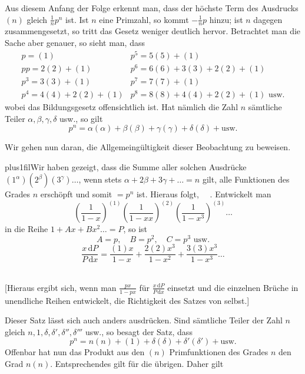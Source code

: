 Aus diesem Anfang der Folge erkennt man, dass der höchste Term des Ausdrucks $(n)$ gleich $\frac1n p^n$ ist. Ist $n$ eine Primzahl, so kommt $-\frac1n p$ hinzu; ist $n$ dagegen zusammengesetzt, so tritt das Gesetz weniger deutlich hervor. Betrachtet man die Sache aber genauer, so sieht man, dass
\[
\begin{array}{ll}
p=(1)&p^5=5(5)+(1)\\
pp=2(2)+(1)&p^6=6(6)+3(3)+2(2)+(1)\\
p^3=3(3)+(1)&p^7=7(7)+(1)\\
p^4=4(4)+2(2)+(1)&p^8=8(8)+4(4)+2(2)+(1)\text{ usw.}
\end{array}
\]
wobei das Bildungsgesetz offensichtlich ist. Hat nämlich die Zahl $n$ sämtliche Teiler $\alpha,\beta,\gamma,\delta$ usw., so gilt
\[
p^n=\alpha(\alpha)+\beta(\beta)+\gamma(\gamma)+\delta(\delta)+\text{usw.}
\]

Wir gehen nun daran, die Allgemeingültigkeit dieser Beobachtung zu beweisen.

\begingroup\rightskip=0pt plus1fil\relax Wir haben gezeigt, dass die Summe aller solchen Ausdrücke $(1^\alpha)(2^\beta)(3^\gamma)\ldots$, wenn stets $\alpha+2\beta+3\gamma+\ldots=n$ gilt, alle Funktionen des Grades $n$ erschöpft und somit $=p^n$ ist. Hieraus folgt, \textemdash\ \textemdash\ \textemdash. Entwickelt man
\[
\left(\frac1{1-x}\right)^{(1)}\left(\frac1{1-xx}\right)^{(2)}\left(\frac1{1-x^3}\right)^{(3)}\ldots
\]
in die Reihe $1+Ax+Bx^2\ldots=P$, so ist
\[
A=p,\quad B=p^2,\quad C=p^3\text{ usw.}
\]
\[
\frac{x\,\mathrm{d}P}{P\,\mathrm{d}x}=\frac{(1)x}{1-x}+\frac{2(2)x^3}{1-x^2}+\frac{3(3)x^3}{1-x^3}\ldots
\]
\noindent\hspace*{.28\linewidth}\textemdash\ \textemdash\ \textemdash\ \textemdash\par\endgroup

[Hieraus ergibt sich, wenn man $\frac{px}{1-px}$ für $\frac{x\,\mathrm{d}P}{P\,\mathrm{d}x}$ einsetzt und die einzelnen Brüche in unendliche Reihen entwickelt, die Richtigkeit des Satzes von selbst.]

Dieser Satz lässt sich auch anders ausdrücken. Sind sämtliche Teiler der Zahl $n$ gleich $n,1,\delta,\delta',\delta'',\delta'''$ usw., so besagt der Satz, dass
\[
p^n=n(n)+(1)+\delta(\delta)+\delta'(\delta')+\text{usw.}
\]
Offenbar hat nun das Produkt aus den $(n)$ Primfunktionen des Grades $n$ den Grad $n(n)$. Entsprechendes gilt für die übrigen. Daher gilt

